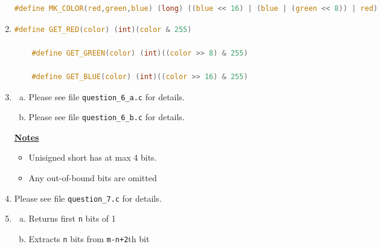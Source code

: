 \documentclass[12pt]{article}
\begin{document}
\begin{enumerate}[1.]
\begin{lstlisting}[language=c]
    #define MK_COLOR(red,green,blue) (long) ((blue << 16) | (blue | (green << 8)) | red)
\end{lstlisting}

    \item

\begin{lstlisting}[language=c]
    #define GET_RED(color) (int)(color & 255)

    #define GET_GREEN(color) (int)((color >> 8) & 255)

    #define GET_BLUE(color) (int)((color >> 16) & 255)
\end{lstlisting}

    \item

    \begin{enumerate}[a)]

        \item

        Please see file \texttt{question\_6\_a.c} for details.

        \item

        Please see file \texttt{question\_6\_b.c} for details.

    \end{enumerate}

    \bigskip

    \underline{\textbf{Notes}}

    \begin{itemize}
        \item Unisigned short has at max 4 bits.
        \item Any out-of-bound bits are omitted
    \end{itemize}

    \item

    Please see file \texttt{question\_7.c} for details.

    \item

    \begin{enumerate}[a)]
        \item Returns first \texttt{n} bits of 1
        \item Extracts \texttt{n} bits from \texttt{m-n+2}th bit
    \end{enumerate}
\end{enumerate}
\end{document}
